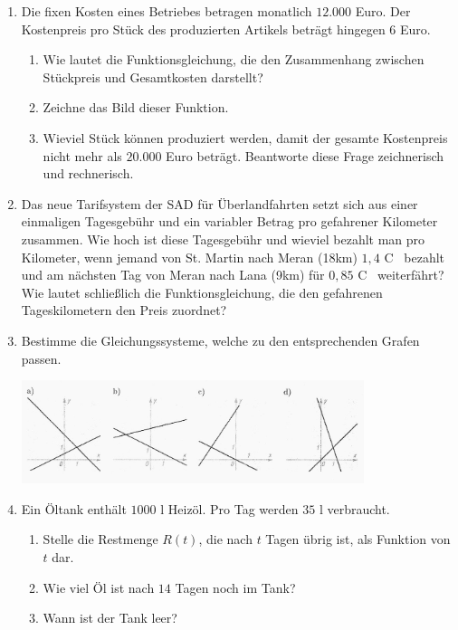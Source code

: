 \documentclass[a4paper, twoside, parskip, 10pt, smallheadings]{scrbook}
\newcommand\euro{{\sffamily C%
    \makebox[0pt][l]{\kern-.70em\mbox{--}}%
    \makebox[0pt][l]{\kern-.68em\raisebox{.25ex}{--}}}}
\theoremstyle{plain}
\theoremstyle{definition}
\newcommand{\bn}{\begin{enumerate}}
\newcommand{\en}{\end{enumerate}}
\begin{document}
\begin{enumerate}
\item Die fixen Kosten eines Betriebes betragen monatlich $12.000$ Euro. Der Kostenpreis pro St\"{u}ck des produzierten
Artikels betr\"{a}gt hingegen $6$ Euro.
\begin{enumerate}
\item Wie lautet die Funktionsgleichung, die den Zusammenhang zwischen St\"{u}ckpreis und Gesamtkosten darstellt?
\item Zeichne das Bild dieser Funktion.
\item Wieviel St\"{u}ck k\"{o}nnen produziert werden, damit der gesamte Kostenpreis nicht mehr als $20.000$ Euro betr\"{a}gt.
Beantworte diese Frage zeichnerisch und rechnerisch.
\end{enumerate}
\item Das neue Tarifsystem der SAD f\"{u}r \"{U}berlandfahrten setzt sich aus einer einmaligen Tagesgeb\"{u}hr und ein variabler Betrag
pro gefahrener Kilometer zusammen. Wie hoch ist diese Tagesgeb\"{u}hr und wieviel bezahlt man pro Kilometer, wenn
jemand von St. Martin nach Meran (18km) $1,4$ \euro \, bezahlt und am n\"{a}chsten Tag von Meran nach Lana (9km)
f\"{u}r $0,85$ \euro \, weiterf\"{a}hrt? Wie lautet schlie{\ss}lich die Funktionsgleichung, die den gefahrenen
Tageskilometern den Preis zuordnet?



\item

Bestimme die Gleichungssysteme, welche zu den entsprechenden Grafen passen.
\begin{center}
\includegraphics[width=10cm]{2te/linearefunktion/bilder/scanimage200502.jpg}
\end{center}





\item Ein Öltank enthält  $1000$ l Heizöl. Pro Tag werden $35$ l verbraucht.
\bn \item Stelle die Restmenge $R(t)$, die nach $t$ Tagen übrig ist, als Funktion von $t$ dar.
\item Wie viel Öl ist nach $14$ Tagen noch im Tank?
\item Wann ist der Tank leer? \en


\end{enumerate}
\end{document}
